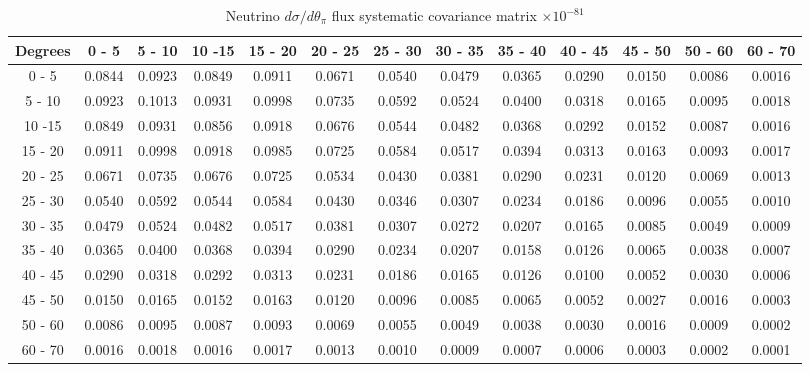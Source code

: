 \documentclass[aps,prl,twocolumn,showpacs,superscriptaddress,nofootinbib]{revtex4}
\begin{document}
\begingroup
\squeezetable
\begin{table}[h]
\tabcolsep=0.11cm
\begin{tabular}{c|cccccccccccc}
Degrees & 0 - 5 & 5 - 10 & 10 -15 & 15 - 20 & 20 - 25 & 25 - 30 & 30 - 35 & 35 - 40 & 40 - 45 & 45 - 50 & 50 - 60 & 60 - 70 \\
\hline
 0 - 5&0.0844 & 0.0923 & 0.0849 & 0.0911 & 0.0671 & 0.0540 & 0.0479 & 0.0365 & 0.0290 & 0.0150 & 0.0086 & 0.0016 \\ 
5 - 10 &0.0923 & 0.1013 & 0.0931 & 0.0998 & 0.0735 & 0.0592 & 0.0524 & 0.0400 & 0.0318 & 0.0165 & 0.0095 & 0.0018  \\
10 -15 &0.0849 & 0.0931 & 0.0856 & 0.0918 & 0.0676 & 0.0544 & 0.0482 & 0.0368 & 0.0292 & 0.0152 & 0.0087 & 0.0016  \\
15 - 20 &0.0911 & 0.0998 & 0.0918 & 0.0985 & 0.0725 & 0.0584 & 0.0517 & 0.0394 & 0.0313 & 0.0163 & 0.0093 & 0.0017  \\
20 - 25 &0.0671 & 0.0735 & 0.0676 & 0.0725 & 0.0534 & 0.0430 & 0.0381 & 0.0290 & 0.0231 & 0.0120 & 0.0069 & 0.0013  \\
25 - 30 &0.0540 & 0.0592 & 0.0544 & 0.0584 & 0.0430 & 0.0346 & 0.0307 & 0.0234 & 0.0186 & 0.0096 & 0.0055 & 0.0010  \\
30 - 35 &0.0479 & 0.0524 & 0.0482 & 0.0517 & 0.0381 & 0.0307 & 0.0272 & 0.0207 & 0.0165 & 0.0085 & 0.0049 & 0.0009  \\
35 - 40 &0.0365 & 0.0400 & 0.0368 & 0.0394 & 0.0290 & 0.0234 & 0.0207 & 0.0158 & 0.0126 & 0.0065 & 0.0038 & 0.0007  \\
40 - 45 &0.0290 & 0.0318 & 0.0292 & 0.0313 & 0.0231 & 0.0186 & 0.0165 & 0.0126 & 0.0100 & 0.0052 & 0.0030 & 0.0006  \\
45 - 50 &0.0150 & 0.0165 & 0.0152 & 0.0163 & 0.0120 & 0.0096 & 0.0085 & 0.0065 & 0.0052 & 0.0027 & 0.0016 & 0.0003  \\
50 - 60 &0.0086 & 0.0095 & 0.0087 & 0.0093 & 0.0069 & 0.0055 & 0.0049 & 0.0038 & 0.0030 & 0.0016 & 0.0009 & 0.0002  \\
60 - 70 &0.0016 & 0.0018 & 0.0016 & 0.0017 & 0.0013 & 0.0010 & 0.0009 & 0.0007 & 0.0006 & 0.0003 & 0.0002 & 0.0001  \\
 
\end{tabular}
\caption{Neutrino $d\sigma/d\theta_\pi$ flux systematic covariance matrix  $\times 10^{-81}$ }
\label{tab:thpi-flux}
\end{table}
\endgroup
\end{document}
